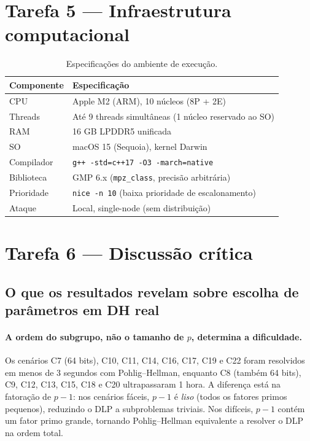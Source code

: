 \documentclass[conference, onecolumn]{IEEEtran}
\begin{document}
\section{Tarefa 5 — Infraestrutura computacional}

\begin{table}[H]
\centering
\caption{Especificações do ambiente de execução.}
\begin{tabular}{@{}ll@{}}
\toprule
\textbf{Componente} & \textbf{Especificação} \\
\midrule
CPU       & Apple M2 (ARM), 10 núcleos (8P + 2E) \\
Threads   & Até 9 threads simultâneas (1 núcleo reservado ao SO) \\
RAM       & 16 GB LPDDR5 unificada \\
SO        & macOS 15 (Sequoia), kernel Darwin \\
Compilador& \texttt{g++ -std=c++17 -O3 -march=native} \\
Biblioteca& GMP 6.x (\texttt{mpz\_class}, precisão arbitrária) \\
Prioridade& \texttt{nice -n 10} (baixa prioridade de escalonamento) \\
Ataque    & Local, single-node (sem distribuição) \\
\bottomrule
\end{tabular}
\end{table}

\section{Tarefa 6 — Discussão crítica}

\subsection{O que os resultados revelam sobre escolha de parâmetros em DH real}

\paragraph{A ordem do subgrupo, não o tamanho de $p$, determina a dificuldade.}
Os cenários C7 (64 bits), C10, C11, C14, C16, C17, C19 e C22 foram resolvidos em menos
de 3 segundos com Pohlig--Hellman, enquanto C8 (também 64 bits), C9, C12, C13, C15, C18
e C20 ultrapassaram 1 hora. A diferença está na fatoração de $p-1$: nos cenários fáceis,
$p-1$ é \emph{liso} (todos os fatores primos pequenos), reduzindo o DLP a subproblemas
triviais. Nos difíceis, $p-1$ contém um fator primo grande, tornando Pohlig--Hellman
equivalente a resolver o DLP na ordem total.
\end{document}

